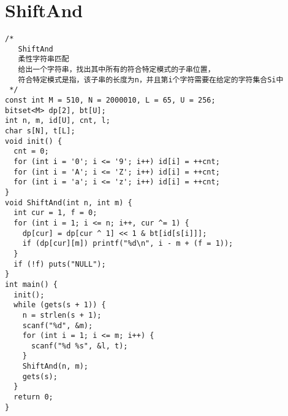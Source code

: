 \section{ ShiftAnd}
\begin{lstlisting}
/*
   ShiftAnd
   柔性字符串匹配
   给出一个字符串，找出其中所有的符合特定模式的子串位置，
   符合特定模式是指，该子串的长度为n，并且第i个字符需要在给定的字符集合Si中
 */
const int M = 510, N = 2000010, L = 65, U = 256;
bitset<M> dp[2], bt[U];
int n, m, id[U], cnt, l;
char s[N], t[L];
void init() {
  cnt = 0;
  for (int i = '0'; i <= '9'; i++) id[i] = ++cnt;
  for (int i = 'A'; i <= 'Z'; i++) id[i] = ++cnt;
  for (int i = 'a'; i <= 'z'; i++) id[i] = ++cnt;
}
void ShiftAnd(int n, int m) {
  int cur = 1, f = 0;
  for (int i = 1; i <= n; i++, cur ^= 1) {
    dp[cur] = dp[cur ^ 1] << 1 & bt[id[s[i]]];
    if (dp[cur][m]) printf("%d\n", i - m + (f = 1));
  }
  if (!f) puts("NULL");
}
int main() {
  init();
  while (gets(s + 1)) {
    n = strlen(s + 1);
    scanf("%d", &m);
    for (int i = 1; i <= m; i++) {
      scanf("%d %s", &l, t);
    }
    ShiftAnd(n, m);
    gets(s);
  }
  return 0;
}
\end{lstlisting}
